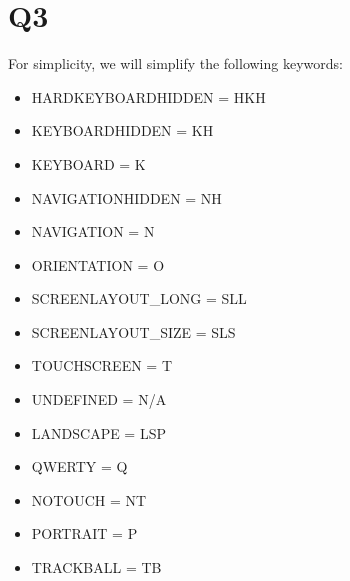 \documentclass[12pt, letterpaper, titlepage]{article}
\begin{document}
\section{Q3}
For simplicity, we will simplify the following keywords:
\begin{itemize}
    \item HARDKEYBOARDHIDDEN = HKH
    \item KEYBOARDHIDDEN = KH 
    \item KEYBOARD = K
    \item NAVIGATIONHIDDEN = NH 
    \item NAVIGATION = N
    \item ORIENTATION = O
    \item SCREENLAYOUT\_LONG = SLL
    \item SCREENLAYOUT\_SIZE = SLS
    \item TOUCHSCREEN = T
    \item UNDEFINED = N/A
    \item LANDSCAPE = LSP 
    \item QWERTY = Q
    \item NOTOUCH = NT 
    \item PORTRAIT = P 
    \item TRACKBALL = TB
\end{itemize}
\end{document}
